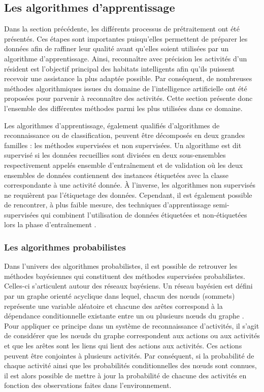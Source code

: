 \subsection{Les algorithmes d'apprentissage}
\label{sec:algos}

Dans la section précédente, les différents processus de prétraitement ont été présentés. Ces étapes sont importantes puisqu'elles permettent de préparer les données afin de raffiner leur qualité avant qu'elles soient utilisées par un algorithme d'apprentissage. Ainsi, reconnaître avec précision les activités d'un résident est l'objectif principal des habitats intelligents afin qu'ils puissent recevoir une assistance la plus adaptée possible. Par conséquent, de nombreuses méthodes algorithmiques issues du domaine de l'intelligence artificielle ont été proposées pour parvenir à reconnaître des activités. Cette section présente donc l'ensemble des différentes méthodes parmi les plus utilisées dans ce domaine.

Les algorithmes d'apprentissage, également qualifiés d'algorithmes de reconnaissance ou de classification, peuvent être décomposés en deux grandes familles : les méthodes supervisées et non supervisées. Un algorithme est dit supervisé si les données recueillies sont divisées en deux sous-ensembles respectivement appelés ensemble d'entraînement et de validation où les deux ensembles de données contiennent des instances étiquetées avec la classe correspondante à une activité donnée. À l'inverse, les algorithmes non supervisés ne requièrent pas l'étiquetage des données. Cependant, il est également possible de rencontrer, à plus faible mesure, des techniques d'apprentissage semi-supervisées qui combinent l'utilisation de données étiquetées et non-étiquetées lors la phase d'entraînement \citep{Zhu2005, Chapelle2006}.

\subsubsection{Les algorithmes probabilistes}

Dans l'univers des algorithmes probabilistes, il est possible de retrouver les méthodes bayésiennes qui constituent des méthodes supervisées probabilistes. Celles-ci s'articulent autour des réseaux bayésiens. Un réseau bayésien est défini par un graphe orienté acyclique dans lequel, chacun des n\oe{}uds (sommets) représente une variable aléatoire et chacune des arêtes correspond à la dépendance conditionnelle existante entre un ou plusieurs n\oe{}uds du graphe \citep{Heckerman1995}. Pour appliquer ce principe dans un système de reconnaissance d'activités, il s'agit de considérer que les n\oe{}uds du graphe correspondent aux actions ou aux activités et que les arêtes sont les liens qui lient des actions aux activités. Ces actions peuvent être conjointes à plusieurs activités. Par conséquent, si la probabilité de chaque activité ainsi que les probabilités conditionnelles des n\oe{}uds sont connues, il est alors possible de mettre à jour la probabilité de chacune des activités en fonction des observations faites dans l'environnement.

